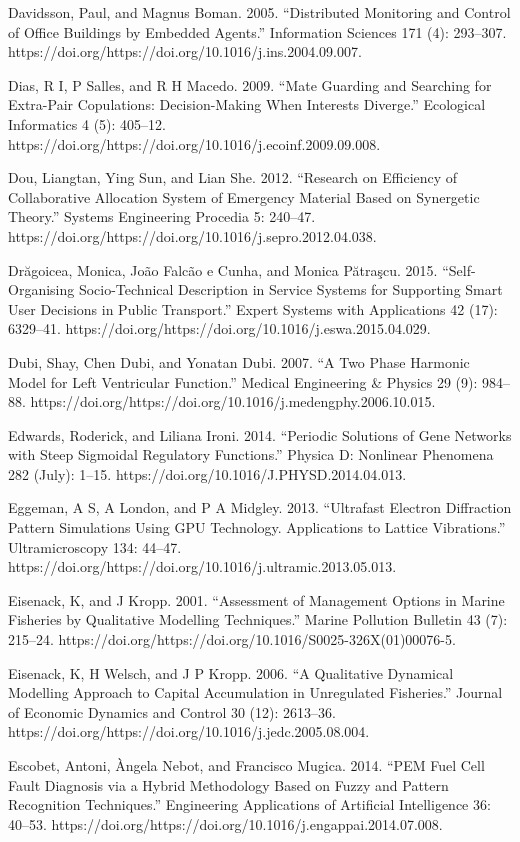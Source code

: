 \documentclass[utf8]{gradu3}
\begin{document}
Davidsson, Paul, and Magnus Boman. 2005. “Distributed Monitoring and Control of Office Buildings by Embedded Agents.” Information Sciences 171 (4): 293–307. https://doi.org/https://doi.org/10.1016/j.ins.2004.09.007.

Dias, R I, P Salles, and R H Macedo. 2009. “Mate Guarding and Searching for Extra-Pair Copulations: Decision-Making When Interests Diverge.” Ecological Informatics 4 (5): 405–12. https://doi.org/https://doi.org/10.1016/j.ecoinf.2009.09.008.

Dou, Liangtan, Ying Sun, and Lian She. 2012. “Research on Efficiency of Collaborative Allocation System of Emergency Material Based on Synergetic Theory.” Systems Engineering Procedia 5: 240–47. https://doi.org/https://doi.org/10.1016/j.sepro.2012.04.038.

Drăgoicea, Monica, João Falcão e Cunha, and Monica Pătraşcu. 2015. “Self-Organising Socio-Technical Description in Service Systems for Supporting Smart User Decisions in Public Transport.” Expert Systems with Applications 42 (17): 6329–41. https://doi.org/https://doi.org/10.1016/j.eswa.2015.04.029.

Dubi, Shay, Chen Dubi, and Yonatan Dubi. 2007. “A Two Phase Harmonic Model for Left Ventricular Function.” Medical Engineering \& Physics 29 (9): 984–88. https://doi.org/https://doi.org/10.1016/j.medengphy.2006.10.015.

Edwards, Roderick, and Liliana Ironi. 2014. “Periodic Solutions of Gene Networks with Steep Sigmoidal Regulatory Functions.” Physica D: Nonlinear Phenomena 282 (July): 1–15. https://doi.org/10.1016/J.PHYSD.2014.04.013.

Eggeman, A S, A London, and P A Midgley. 2013. “Ultrafast Electron Diffraction Pattern Simulations Using GPU Technology. Applications to Lattice Vibrations.” Ultramicroscopy 134: 44–47. https://doi.org/https://doi.org/10.1016/j.ultramic.2013.05.013.

Eisenack, K, and J Kropp. 2001. “Assessment of Management Options in Marine Fisheries by Qualitative Modelling Techniques.” Marine Pollution Bulletin 43 (7): 215–24. https://doi.org/https://doi.org/10.1016/S0025-326X(01)00076-5.

Eisenack, K, H Welsch, and J P Kropp. 2006. “A Qualitative Dynamical Modelling Approach to Capital Accumulation in Unregulated Fisheries.” Journal of Economic Dynamics and Control 30 (12): 2613–36. https://doi.org/https://doi.org/10.1016/j.jedc.2005.08.004.

Escobet, Antoni, Àngela Nebot, and Francisco Mugica. 2014. “PEM Fuel Cell Fault Diagnosis via a Hybrid Methodology Based on Fuzzy and Pattern Recognition Techniques.” Engineering Applications of Artificial Intelligence 36: 40–53. https://doi.org/https://doi.org/10.1016/j.engappai.2014.07.008.
\end{document}
